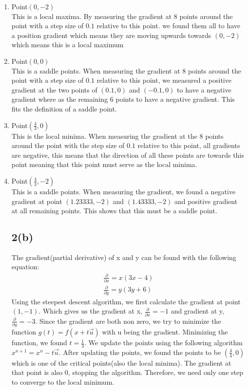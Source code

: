 \documentclass{article}
\begin{document}
\begin{enumerate}
\item Point$(0,-2)$\\
This is a local maxima. By measuring the gradient at 8 points around the point with a step size of $0.1$ relative to this point. we found them all to have a position gradient which means they are moving upwards towards $(0,-2)$ which means this is a local maximum\\
\item Point$(0,0)$\\
This is a saddle points. When measuring the gradient at 8 points around the point with a step size of $0.1$ relative to this point, we measured a positive gradient at the two points of $(0.1,0)$ and $(-0.1,0)$ to have a negative gradient where as the remaining 6 points to have a negative gradient. This fits the definition of a saddle point.
\item Point$(\frac{4}{3},0)$\\
This is the local minima. When measuring the gradient at the 8 points around the point with the step size of $0.1$ relative to this point, all gradients are negative, this means that the direction of all these points are towards this point meaning that this point must serve as the local minima.
\item Point$(\frac{4}{3},-2)$\\
This is a saddle points. When measuring the gradient, we found a negative gradient at point $(1.23333,-2)$ and $(1.43333,-2)$ and positive gradient at all remaining points. This shows that this must be a saddle point.
\subsection*{2(b)}
The gradient(partial derivative) of x and y can be found with the following equation:
\begin{equation*}
\begin{aligned}
\frac{\partial}{\partial x}  = x(3x - 4)\\
\frac{\partial}{\partial y}  = y(3y + 6)
\end{aligned}
\end{equation*}
Using the steepest descent algorithm, we first calculate the gradient at point $(1,-1)$. Which gives us the gradient at x, $\frac{\partial}{\partial x} = -1$ and gradient at y, $\frac{\partial}{\partial y} = -3$. Since the gradient are both non zero, we try to minimize the function $g(t) = f(x + t\vec{u})$ with u being the gradient. Minimizing the function, we found $t = \frac{1}{3}$. We update the points using the following algorithm $x^{n+1} = x^{n} - t\vec{u}$. After updating the points, we found the points to be $(\frac{4}{3},0)$ which is one of the critical points(also the local minima). The gradient at that point is also $0$, stopping the algorithm. Therefore, we need only one step to converge to the local minimum.

\end{enumerate}
\end{document}
